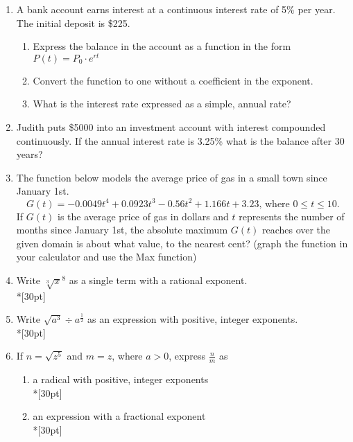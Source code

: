 \documentclass[12pt, oneside]{article}
\begin{document}
\begin{enumerate}


\item A bank account earns interest at a continuous interest rate of 5\% per year. The initial deposit is \$225.
\begin{enumerate}
    \item Express the balance in the account as a function in the form $P(t)=P_0 \cdot e^{rt}$\\[30pt]
    \item Convert the function to one without a coefficient in the exponent. \\[30pt]
    \item What is the interest rate expressed as a simple, annual rate?\\[30pt]
\end{enumerate}

\item Judith puts \$5000 into an investment account with interest compounded continuously. If the annual interest rate is 3.25\% what is the balance after 30 years?\\[80pt]

\item The function below models the average price of gas in a small town since January 1st.
\[G(t)=-0.0049t^4 + 0.0923t^3 - 0.56t^2 +1.166t+3.23 \text{, where } 0 \leq t \leq 10.\]
If $G(t)$ is the average price of gas in dollars and $t$ represents the number of months since January 1st, the absolute maximum $G(t)$ reaches over the given domain is about what value, to the nearest cent? (graph the function in your calculator and use the Max function)%

\newpage


\item Write $\sqrt[3]x^8$ as a single term with a rational exponent.\\*[30pt]

\item Write $\sqrt{a^3} \div a^{\frac{1}{2}}$ as an expression with positive, integer exponents.\\*[30pt]

\item If $n=\sqrt{z^5}$ and $m=z$, where $a > 0$, express $\frac{n}{m}$ as 
\begin{enumerate}
    \item a radical with positive, integer exponents\\*[30pt]
    \item an expression with a fractional exponent\\*[30pt]
\end{enumerate}


\end{enumerate}
\end{document}

